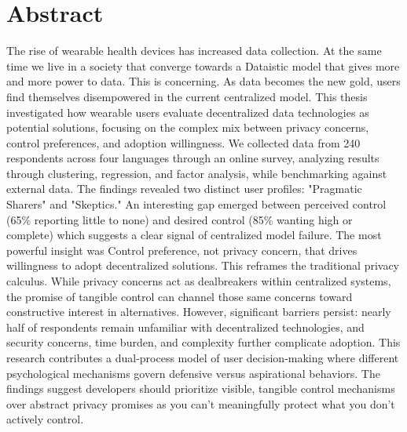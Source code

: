 \documentclass[12pt,a4paper]{article}
\begin{document}
    


    \setcounter{page}{1}

    \section*{Abstract}
    The rise of wearable health devices has increased data collection. At the same time we live in a society that converge towards a Dataistic model that gives more and more power to data. This is concerning. As data becomes the new gold, users find themselves disempowered in the current centralized model. This thesis investigated how wearable users evaluate decentralized data technologies as potential solutions, focusing on the complex mix between privacy concerns, control preferences, and adoption willingness. 
    We collected data from 240 respondents across four languages through an online survey, analyzing results through clustering, regression, and factor analysis, while benchmarking against external data. The findings revealed two distinct user profiles: "Pragmatic Sharers" and "Skeptics." An interesting gap emerged between perceived control (65\% reporting little to none) and desired control (85\% wanting high or complete) which suggests a clear signal of centralized model failure. 
    The most powerful insight was Control preference, not privacy concern, that drives willingness to adopt decentralized solutions. This reframes the traditional privacy calculus. While privacy concerns act as dealbreakers within centralized systems, the promise of tangible control can channel those same concerns toward constructive interest in alternatives. However, significant barriers persist: nearly half of respondents remain unfamiliar with decentralized technologies, and security concerns, time burden, and complexity further complicate adoption.
    This research contributes a dual-process model of user decision-making where different psychological mechanisms govern defensive versus aspirational behaviors. The findings suggest developers should prioritize visible, tangible control mechanisms over abstract privacy promises as you can't meaningfully protect what you don't actively control.
    \clearpage
\end{document}
